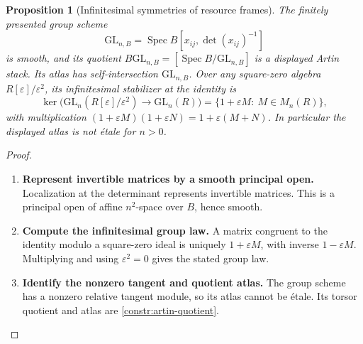 \documentclass[11pt,a4paper]{article}
\numberwithin{algorithm}{section}
\numberwithin{equation}{section}
\newtheorem{proposition}[proposition]{Proposition}
\theoremstyle{definition}
\theoremstyle{remark}
\theoremstyle{plain}
\newcommand{\eps}{\varepsilon}
\theoremstyle{definition}
\theoremstyle{plain}
\begin{document}
\begin{proposition}[Infinitesimal symmetries of resource frames]
\label{prop:artin-gl}
The finitely presented group scheme
\[
 \mathrm{GL}_{n,B}=
 \operatorname{Spec}B[x_{ij},\det(x_{ij})^{-1}]
\]
is smooth, and its quotient $B\mathrm{GL}_{n,B}=[\operatorname{Spec}B/\mathrm{GL}_{n,B}]$
is a displayed Artin stack.  Its atlas has self-intersection
$\mathrm{GL}_{n,B}$.  Over any square-zero algebra $R[\eps]/\eps^2$,
its infinitesimal stabilizer at the identity is
\[
 \ker\bigl(\mathrm{GL}_n(R[\eps]/\eps^2)
           \to\mathrm{GL}_n(R)\bigr)
 =\{1+\eps M:\ M\in M_n(R)\},
\]
with multiplication $(1+\eps M)(1+\eps N)=1+\eps(M+N)$.
In particular the displayed atlas is not \'etale for $n>0$.
\end{proposition}
\begin{proof}\leavevmode
\begin{enumerate}[leftmargin=*,align=left]
\item \textbf{Represent invertible matrices by a smooth principal open.}
Localization at the determinant represents invertible matrices.
This is a principal open of affine $n^2$-space over $B$, hence smooth.

\item \textbf{Compute the infinitesimal group law.}
A matrix congruent
to the identity modulo a square-zero ideal is uniquely
$1+\eps M$, with inverse $1-\eps M$.  Multiplying and
using $\eps^2=0$ gives the stated group law.

\item \textbf{Identify the nonzero tangent and quotient atlas.}
The group
scheme has a nonzero relative tangent module, so its atlas
cannot be \'etale.  Its torsor quotient and atlas are
\cref{constr:artin-quotient}.
\end{enumerate}
\end{proof}
\end{document}
